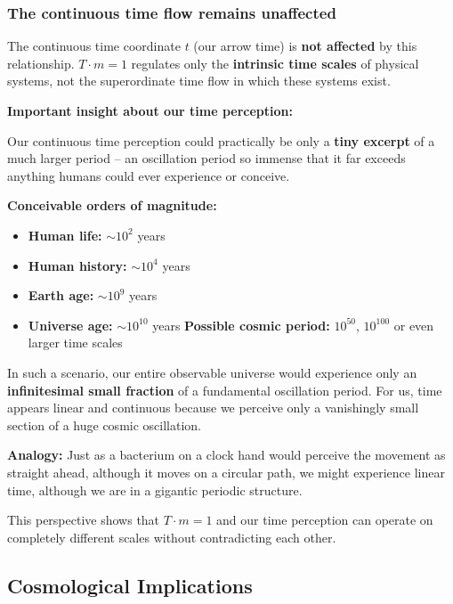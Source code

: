 	\subsubsection{The continuous time flow remains unaffected}
	
	The continuous time coordinate $t$ (our \glqq arrow time\grqq) is \textbf{not affected} by this relationship. $T \cdot m = 1$ regulates only the \textbf{intrinsic time scales} of physical systems, not the superordinate time flow in which these systems exist.
	
	\textbf{Important insight about our time perception:}
	
	Our continuous time perception could practically be only a \textbf{tiny excerpt} of a much larger period -- an oscillation period so immense that it far exceeds anything humans could ever experience or conceive.
	
	\textbf{Conceivable orders of magnitude:}
	\begin{itemize}
		\item \textbf{Human life:} $\sim 10^2$ years
		\item \textbf{Human history:} $\sim 10^4$ years
		\item \textbf{Earth age:} $\sim 10^9$ years
		\item \textbf{Universe age:} $\sim 10^{10}$ years
		\textbf{Possible cosmic period:} $10^{50}$, $10^{100}$ or even larger time scales
	\end{itemize}
	
	In such a scenario, our entire observable universe would experience only an \textbf{infinitesimal small fraction} of a fundamental oscillation period. For us, time appears linear and continuous because we perceive only a vanishingly small section of a huge cosmic \glqq oscillation\grqq.
	
	\textbf{Analogy:} Just as a bacterium on a clock hand would perceive the movement as \glqq straight ahead\grqq, although it moves on a circular path, we might experience \glqq linear time\grqq, although we are in a gigantic periodic structure.
	
	This perspective shows that $T \cdot m = 1$ and our time perception can operate on completely different scales without contradicting each other.
	
	\subsection{Cosmological Implications}
	

